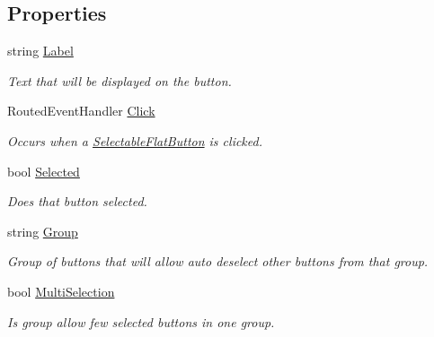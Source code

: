 \subsection*{Properties}
\begin{DoxyCompactItemize}
\item 
string \mbox{\hyperlink{class_wpf_handler_1_1_u_i_1_1_controls_1_1_selectable_flat_button_a082859dda84e188a1da2d0e9ba919058}{Label}}
\begin{DoxyCompactList}\small\item\em Text that will be displayed on the button. \end{DoxyCompactList}\item 
Routed\+Event\+Handler \mbox{\hyperlink{class_wpf_handler_1_1_u_i_1_1_controls_1_1_selectable_flat_button_a08e6400871439c5e9ca1772f26710860}{Click}}
\begin{DoxyCompactList}\small\item\em Occurs when a \mbox{\hyperlink{class_wpf_handler_1_1_u_i_1_1_controls_1_1_selectable_flat_button}{Selectable\+Flat\+Button}} is clicked. \end{DoxyCompactList}\item 
bool \mbox{\hyperlink{class_wpf_handler_1_1_u_i_1_1_controls_1_1_selectable_flat_button_ad1ff756964fdb1d04f2ca04a41c67f1c}{Selected}}
\begin{DoxyCompactList}\small\item\em Does that button selected. \end{DoxyCompactList}\item 
string \mbox{\hyperlink{class_wpf_handler_1_1_u_i_1_1_controls_1_1_selectable_flat_button_a2df582128e2ef8858ff4c6f174800b9d}{Group}}
\begin{DoxyCompactList}\small\item\em Group of buttons that will allow auto deselect other buttons from that group. \end{DoxyCompactList}\item 
bool \mbox{\hyperlink{class_wpf_handler_1_1_u_i_1_1_controls_1_1_selectable_flat_button_ac13d0a092b070729c49587c58f050971}{Multi\+Selection}}
\begin{DoxyCompactList}\small\item\em Is group allow few selected buttons in one group. \end{DoxyCompactList}\item 

\end{DoxyCompactItemize}
